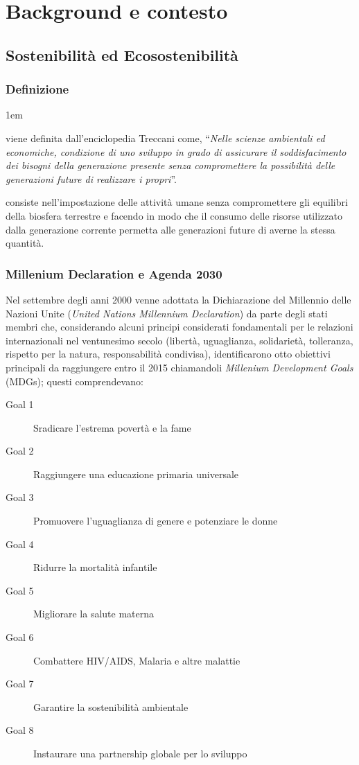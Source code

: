 \chapter{Background e contesto}
%
\section{Sostenibilità ed Ecosostenibilità}
\subsection{Definizione}
\begin{description}
    \itemsep1em
    \item [Sostenibilità] viene definita dall'enciclopedia Treccani \cite{treccaniEnc} come, \enquote{\textit{Nelle scienze ambientali ed economiche, condizione di uno sviluppo in grado di assicurare il soddisfacimento dei bisogni della generazione presente senza compromettere la possibilità delle generazioni future di realizzare i propri}}.
    \item [Ecosostenibilità] consiste nell'impostazione delle attività umane senza compromettere gli equilibri della biosfera terrestre e facendo in modo che il consumo delle risorse utilizzato dalla generazione corrente permetta alle generazioni future di averne la stessa quantità.
\end{description}
\newpage
\subsection{Millenium Declaration e Agenda 2030}
Nel settembre degli anni 2000 venne adottata la Dichiarazione del Millennio delle Nazioni Unite (\textit{United Nations Millennium Declaration}) \cite{millennium_declaration} da parte degli stati membri che, considerando alcuni principi considerati fondamentali per le relazioni internazionali nel ventunesimo secolo (libertà, uguaglianza, solidarietà, tolleranza, rispetto per la natura, responsabilità condivisa), identificarono otto obiettivi principali da raggiungere entro il 2015 chiamandoli \textit{Millenium Development Goals} (MDGs); questi comprendevano:
\begin{description}
    \item[Goal 1] Sradicare l'estrema povertà e la fame
    \item[Goal 2] Raggiungere una educazione primaria universale
    \item[Goal 3] Promuovere l'uguaglianza di genere e potenziare le donne
    \item[Goal 4] Ridurre la mortalità infantile
    \item[Goal 5] Migliorare la salute materna
    \item[Goal 6] Combattere HIV/AIDS, Malaria e altre malattie
    \item[Goal 7] Garantire la sostenibilità ambientale
    \item[Goal 8] Instaurare una partnership globale per lo sviluppo
\end{description}

